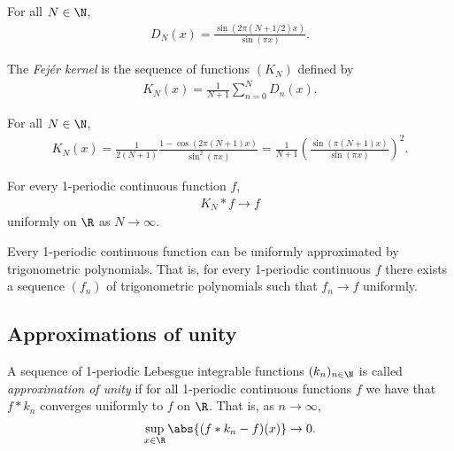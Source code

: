 \documentclass{article}
\begin{document}
\begin{lemma}[Notes 5.3]
	For all $N\in\N$,
	\begin{align*}
		D_N(x)=\frac{\sin(2\pi(N+1/2)x)}{\sin(\pi x)}.
	\end{align*}
\end{lemma}

\begin{definition}
	The \emph{Fej\'er kernel} is the sequence of functions
	$(K_N)$ defined by
	\begin{align*}
		K_N(x)=\frac{1}{N+1}\sum_{n=0}^ND_n(x).
	\end{align*}
\end{definition}

\begin{lemma}[Notes 5.4]
	For all $N\in\N$,
	\begin{align*}
		K_N(x)=\frac{1}{2(N+1)}\frac{1-\cos(2\pi(N+1)x)}{\sin^2(\pi x)}
		=\frac{1}{N+1}\left(\frac{\sin(\pi(N+1)x)}{\sin(\pi x)}\right)^2.
	\end{align*}
\end{lemma}

\begin{theorem}[Fej\'er]
	For every 1-periodic continuous function $f$,
	\begin{align*}
		K_N*f\to f
	\end{align*}
	uniformly on $\R$ as $N\to \infty$.
\end{theorem}

\begin{corollary*}
	Every 1-periodic continuous function can be uniformly approximated by trigonometric
	polynomials. That is, for every 1-periodic continuous $f$ there exists a sequence
	$(f_n)$ of trigonometric polynomials such that $f_n\to f$ uniformly.
\end{corollary*}

\subsection{Approximations of unity}

\begin{definition}
	A sequence of 1-periodic Lebesgue integrable functions $(k_n)_{n\in\N}$ is called \emph{approximation
		of unity} if for all 1-periodic continuous functions $f$ we have that $f*k_n$ converges
	uniformly to $f$ on $\R$. That is, as $n\to\infty$,
	\begin{align*}
		\sup_{x\in\R}\abs{(f*k_n-f)(x)}\to 0.
	\end{align*}
\end{definition}
\end{document}
